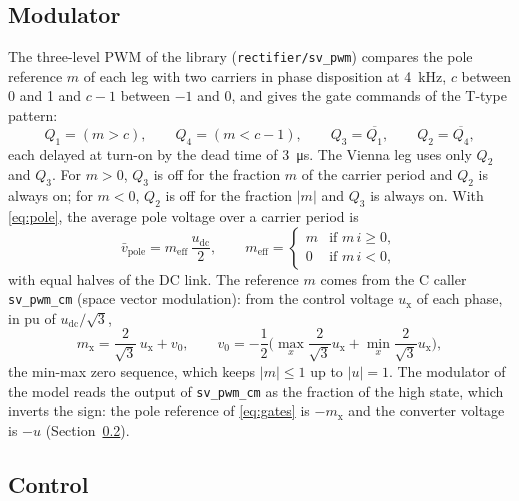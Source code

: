 \documentclass[11pt,a4paper]{scrartcl}
\newcommand{\ped}[1]{_{\mathrm{#1}}}
\newcommand{\code}[1]{\texttt{#1}}
\begin{document}
\begin{onehalfspace}
\subsection{Modulator}
\label{sec:modulator}

The three-level PWM of the library (\code{rectifier/sv\_pwm}) compares the pole reference $m$ of each leg with two carriers in phase disposition at \SI{4}{\kilo\hertz}, $c$ between 0 and 1 and $c - 1$ between $-1$ and 0, and gives the gate commands of the T-type pattern:
\begin{equation}
	Q_1 = (m > c), \qquad Q_4 = (m < c - 1), \qquad Q_3 = \overline{Q_1}, \qquad Q_2 = \overline{Q_4},
	\label{eq:gates}
\end{equation}
each delayed at turn-on by the dead time of \SI{3}{\micro\second}. The Vienna leg uses only $Q_2$ and $Q_3$. For $m > 0$, $Q_3$ is off for the fraction $m$ of the carrier period and $Q_2$ is always on; for $m < 0$, $Q_2$ is off for the fraction $|m|$ and $Q_3$ is always on. With \eqref{eq:pole}, the average pole voltage over a carrier period is
\begin{equation}
	\bar v\ped{pole} = m\ped{eff}\, \frac{u\ped{dc}}{2}, \qquad
	m\ped{eff} = \begin{cases} m & \text{if } m\, i \ge 0, \\ 0 & \text{if } m\, i < 0, \end{cases}
	\label{eq:meff}
\end{equation}
with equal halves of the DC link. The reference $m$ comes from the C caller \code{sv\_pwm\_cm} (space vector modulation): from the control voltage $u\ped{x}$ of each phase, in pu of $u\ped{dc}/\sqrt3$,
\begin{equation}
	m\ped{x} = \frac{2}{\sqrt3}\, u\ped{x} + v_0, \qquad v_0 = -\frac{1}{2}\Big(\max_x \frac{2}{\sqrt3} u\ped{x} + \min_x \frac{2}{\sqrt3} u\ped{x}\Big),
	\label{eq:svm}
\end{equation}
the min-max zero sequence, which keeps $|m| \le 1$ up to $|u| = 1$. The modulator of the model reads the output of \code{sv\_pwm\_cm} as the fraction of the high state, which inverts the sign: the pole reference of \eqref{eq:gates} is $-m\ped{x}$ and the converter voltage is $-u$ (Section~\ref{sec:control}).

\subsection{Control}
\label{sec:control}


\end{onehalfspace}
\end{document}
